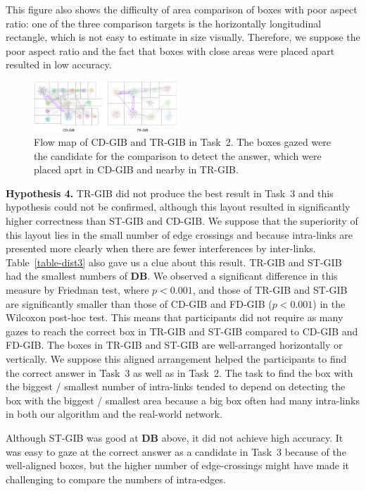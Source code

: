 \documentclass[review]{vgtc}                 %
\begin{document}
This figure also shows the difficulty of area comparison of boxes with poor aspect ratio: one of the three comparison targets is the horizontally longitudinal rectangle, which is not easy to estimate in size visually. Therefore, we suppose the poor aspect ratio and the fact that boxes with close areas were placed apart resulted in low accuracy.

\begin{figure}[t]
  \begin{center}
    \includegraphics[width=0.48\textwidth]{pictures/cd-tr-in2.png}
    \caption{Flow map of CD-GIB and TR-GIB in Task~2. The boxes gazed were the candidate for the comparison to detect the answer, which were placed aprt in CD-GIB and nearby in TR-GIB.}
    \label{task2flow}
  \end{center}
\end{figure}

{\bf Hypothesis 4.} TR-GIB did not produce the best result in Task~3 and this hypothesis could not be confirmed, although this layout resulted in significantly higher correctness than ST-GIB and CD-GIB.
We suppose that the superiority of this layout lies in the small number of edge crossings and because intra-links are presented more clearly when there are fewer interferences by inter-links.
Table~\ref{table-dist3} also gave us a clue about this result.
TR-GIB and ST-GIB had the smallest numbers of {\bf DB}.
We observed a significant difference in this measure by Friedman test, where $p<0.001$, and those of TR-GIB and ST-GIB are significantly smaller than those of CD-GIB and FD-GIB ($p<0.001$) in the Wilcoxon post-hoc test.
This means that participants did not require as many gazes to reach the correct box in TR-GIB and ST-GIB compared to CD-GIB and FD-GIB.
The boxes in TR-GIB and ST-GIB are well-arranged horizontally or vertically.
We suppose this aligned arrangement helped the participants to find the correct answer in Task~3 as well as in Task~2.
The task to find the box with the biggest / smallest number of intra-links tended to depend on detecting the box with the biggest / smallest area because a big box often had many intra-links in both our algorithm and the real-world network.

Although ST-GIB was good at {\bf DB} above, it did not achieve high accuracy.
It was easy to gaze at the correct answer as a candidate in Task~3 because of the well-aligned boxes, but the higher number of edge-crossings might have made it challenging to compare the numbers of intra-edges.
\end{document}
